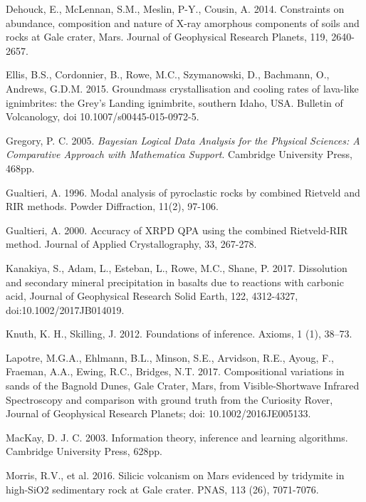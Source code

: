 \documentclass[preprint, a4paper]{elsarticle}
\begin{document}
\begin{thebibliography}{99}
Dehouck, E., McLennan, S.M., Meslin, P-Y., Cousin, A. 2014. Constraints on abundance, composition and nature of X-ray amorphous components of soils and rocks at Gale crater, Mars. Journal of Geophysical Research Planets, 119, 2640-2657.

Ellis, B.S., Cordonnier, B., Rowe, M.C., Szymanowski, D., Bachmann, O., Andrews, G.D.M. 2015. Groundmass crystallisation and cooling rates of lava-like ignimbrites: the Grey’s Landing ignimbrite, southern Idaho, USA. Bulletin of Volcanology, doi 10.1007/s00445-015-0972-5.

Gregory, P. C. 2005.
\newblock \emph{Bayesian Logical Data Analysis for the Physical Sciences: A
  Comparative Approach with Mathematica{\textregistered} Support}.
\newblock Cambridge University Press, 468pp.

Gualtieri, A. 1996. Modal analysis of pyroclastic rocks by combined Rietveld and RIR methods. Powder Diffraction, 11(2), 97-106.

Gualtieri, A. 2000. Accuracy of XRPD QPA using the combined Rietveld-RIR method. Journal of Applied Crystallography, 33, 267-278.

Kanakiya, S., Adam, L., Esteban, L., Rowe, M.C., Shane, P. 2017. Dissolution and secondary mineral precipitation in basalts due to reactions with carbonic acid, Journal of Geophysical Research Solid Earth, 122, 4312-4327, doi:10.1002/2017JB014019.

Knuth, K. H., Skilling, J. 2012.
\newblock Foundations of inference.
\newblock Axioms, 1 (1),  38--73.

Lapotre, M.G.A., Ehlmann, B.L., Minson, S.E., Arvidson, R.E., Ayoug, F., Fraeman, A.A., Ewing, R.C., Bridges, N.T. 2017. Compositional variations in sands of the Bagnold Dunes, Gale Crater, Mars, from Visible-Shortwave Infrared Spectroscopy and comparison with ground truth from the Curiosity Rover, Journal of Geophysical Research Planets; doi: 10.1002/2016JE005133.

MacKay, D. J. C. 2003. Information theory, inference and learning algorithms. Cambridge University Press, 628pp.

Morris, R.V., et al. 2016. Silicic volcanism on Mars evidenced by tridymite in high-SiO2 sedimentary rock at Gale crater. PNAS, 113 (26), 7071-7076.


\end{thebibliography}
\end{document}
